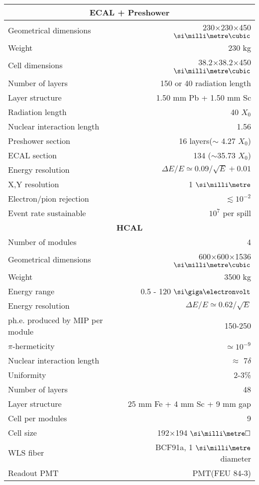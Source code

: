 \begin{longtable}{|l|r|}  
  \hline
  \multicolumn{2}{|c|}{\textbf{ECAL + Preshower}}\\
  \hline
  Geometrical dimensions & 230$\times$230$\times$450 $\mmc$ \\
  Weight & 230 \si{\kilo\gram} \\
  Cell dimensions & 38.2$\times$38.2$\times$450 $\mmc$ \\
  Number of layers & 150 or 40 radiation length \\
  Layer structure & 1.50 mm Pb + 1.50 mm Sc \\
  Radiation length & 40 $X_0$\\
  Nuclear interaction length & 1.56 \\
  Preshower section & 16 layers($\sim$ 4.27 $X_0$) \\
  ECAL section & 134 ($\sim$35.73 $X_0$) \\
  Energy resolution & $\Delta E / E \simeq 0.09 / \sqrt{E} + 0.01$ \\
  X,Y resolution & 1 $\mmi$ \\
  Electron/pion rejection & $\lesssim 10^{-2}$ \\
  Event rate sustainable & $10^{7}$ per spill \\
  \hline
  \multicolumn{2}{|c|}{\textbf{HCAL}}\\
  \hline
  Number of modules & 4 \\
  Geometrical dimensions & 600$\times$600$\times$1536 $\mmc$ \\
  Weight & 3500 \si{\kilo\gram} \\
  Energy range & 0.5 - 120 $\gev$ \\
  Energy resolution & $\Delta E / E \simeq 0.62 / \sqrt{E}$ \\
  ph.e. produced by MIP per module & 150-250 \\
  $\pi$-hermeticity & $\simeq 10^{-9}$ \\
  Nuclear interaction length & $\approx$ 7$\delta$ \\
  Uniformity & 2-3\% \\
  Number of layers & 48 \\
  Layer structure & 25 mm Fe + 4 mm Sc + 9 mm gap\\
  Cell per modules & 9 \\
  Cell size & 192$\times$194 $\mms$ \\
  WLS fiber & BCF91a, 1 $\mmi$ diameter \\
  Readout PMT & PMT(FEU 84-3) \\

\end{longtable}
